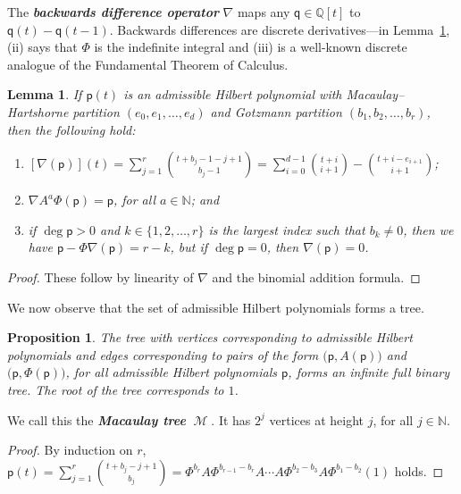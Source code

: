 \documentclass[12pt]{amsart}%
\newtheorem{lemma}[theorem]{Lemma}
\newtheorem{proposition}[theorem]{Proposition}
\theoremstyle{definition}%
\DeclareMathOperator{\Macaulaytree}{\mathscr{M}}%
\newcommand{\hp}{\mathsf{p}}%
\newcommand{\hq}{\mathsf{q}}%
\newcommand{\lift}{\Phi}%
\newcommand{\plus}{A}%
\newcommand{\NN}{\mathbb{N}}%
\newcommand{\QQ}{\mathbb{Q}}%
\begin{document}
The \emph{\bfseries backwards difference operator} $\nabla$ maps any
$\hq \in \QQ[t]$ to $\hq(t) - \hq(t-1)$.  Backwards differences are
discrete derivatives---in Lemma~\ref{lem:liftproperties}, (ii) says
that $\lift$ is the indefinite integral and (iii) is a well-known
discrete analogue of the Fundamental Theorem of Calculus.

\begin{lemma} 
  \label{lem:liftproperties} 
  If $\hp(t)$ is an admissible Hilbert polynomial with
  Macaulay--Hartshorne partition $(e_0, e_1, \dotsc, e_d)$ and
  Gotzmann partition $( b_1, b_2, \dotsc, b_r )$, then the following
  hold:
  \begin{enumerate}
  \item $\left[ \nabla (\hp) \right](t) = \sum_{j=1}^{r} \binom{t +
    b_j-1 - j+1}{b_j-1} = \sum_{i=0}^{d-1} \binom{t + i}{i + 1} -
    \binom{t + i - e_{i+1}}{i + 1}$;

  \item $\nabla \plus^a \lift (\hp) = \hp$, for all $a \in \NN$; and

  \item if $\deg \hp > 0$ and $k \in \{ 1, 2, \dotsc, r \}$ is the
    largest index such that $b_k \neq 0$, then we have
    $\hp - \lift \nabla (\hp) = r - k$, but if $\deg \hp = 0$, then
    $\nabla (\hp) = 0$.
\end{enumerate}
\end{lemma}

\begin{proof}
These follow by linearity of $\nabla$ and the binomial addition
formula.
\end{proof}

We now observe that the set of admissible Hilbert polynomials forms a
tree.

\begin{proposition}
  \label{prop:Macaulaytree}
  The tree with vertices corresponding to admissible Hilbert
  polynomials and edges corresponding to pairs of the form $\bigl(
  \hp, \plus (\hp) \bigr)$ and $\bigl( \hp, \lift (\hp) \bigr)$, for
  all admissible Hilbert polynomials $\hp$, forms an infinite full
  binary tree.  The root of the tree corresponds to $1$.
\end{proposition}

We call this the \emph{\bfseries Macaulay tree} $\Macaulaytree$.  It
has $2^j$ vertices at height $j$, for all $j \in \NN$.

\begin{proof}
  By induction on $r$, $\hp(t) = \sum_{j=1}^r \binom{t + b_j -
    j+1}{b_j} = \lift^{b_r} \plus \lift^{b_{r-1} - b_r} \plus \dotsb
  \plus \lift^{b_2 - b_3} \plus \lift^{b_1 - b_2} (1)$ holds.
\end{proof}
\end{document}
